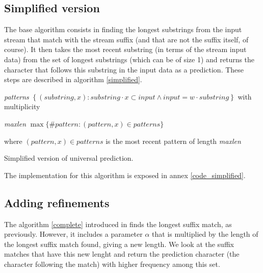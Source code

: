 \documentclass[a4paper,12pt]{article}
\begin{document}
  \subsection{Simplified version}

  The base algorithm consists in finding the longest substrings from the input stream that match with the stream suffix (and that are not the suffix itself, of course). It then takes the most recent substring (in terms of the stream input data) from the set of longest substrings (which can be of size 1) and returns the character that follows this substring in the input data as a prediction. These steps are described in algorithm \ref{simplified}.


    \begin{algorithm}

      \textit{patterns} \gets{}
        $\left\{ (\textit{substring},x) :%
        \textit{substring}\cdot x\subset\textit{input} \wedge
        \textit{input} = w\cdot\textit{substring} \right\}$
        with multiplicity\;

      \textit{maxlen} \gets{} $\max\{\#\textit{pattern} :
        (\textit{pattern},x)\in\textit{patterns}\}$\;

       where $(\textit{pattern},x)\in\textit{patterns}$ is the most
        recent pattern of length \textit{maxlen}\;

      \caption{\label{simplified}Simplified version of universal prediction.}
    \end{algorithm}

    The implementation for this algorithm is exposed in annex \ref{code_simplified}.


  \subsection{Adding refinements}

  The algorithm \ref{complete} introduced in \cite{paper} finds the longest suffix match, as previously. However, it includes a parameter $\alpha$ that is multiplied by the length of the longest suffix match found, giving a new length. We look at the suffix matches that have this new lenght and return the prediction character (the character following the match) with higher frequency among this set.
\end{document}
